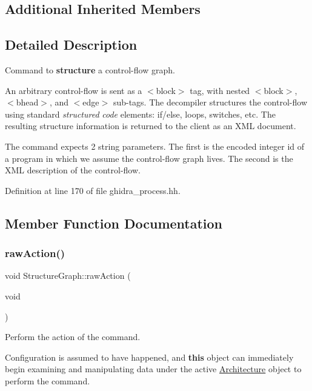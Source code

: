 \subsection*{Additional Inherited Members}


\subsection{Detailed Description}
Command to {\bfseries{structure}} a control-\/flow graph. 

An arbitrary control-\/flow is sent as a $<$block$>$ tag, with nested $<$block$>$, $<$bhead$>$, and $<$edge$>$ sub-\/tags. The decompiler structures the control-\/flow using standard {\itshape structured} {\itshape code} elements\+: if/else, loops, switches, etc. The resulting structure information is returned to the client as an X\+ML document.

The command expects 2 string parameters. The first is the encoded integer id of a program in which we assume the control-\/flow graph lives. The second is the X\+ML description of the control-\/flow. 

Definition at line 170 of file ghidra\+\_\+process.\+hh.



\subsection{Member Function Documentation}
\mbox{\label{class_structure_graph_a498c9004314b3845ca36c46f77b43ed6}} 
\subsubsection{\texorpdfstring{rawAction()}{rawAction()}}
{\footnotesize\ttfamily void Structure\+Graph\+::raw\+Action (\begin{DoxyParamCaption}\item[{void}]{ }\end{DoxyParamCaption})\hspace{0.3cm}{\ttfamily [virtual]}}



Perform the action of the command. 

Configuration is assumed to have happened, and {\bfseries{this}} object can immediately begin examining and manipulating data under the active \mbox{\hyperlink{class_architecture}{Architecture}} object to perform the command. 

